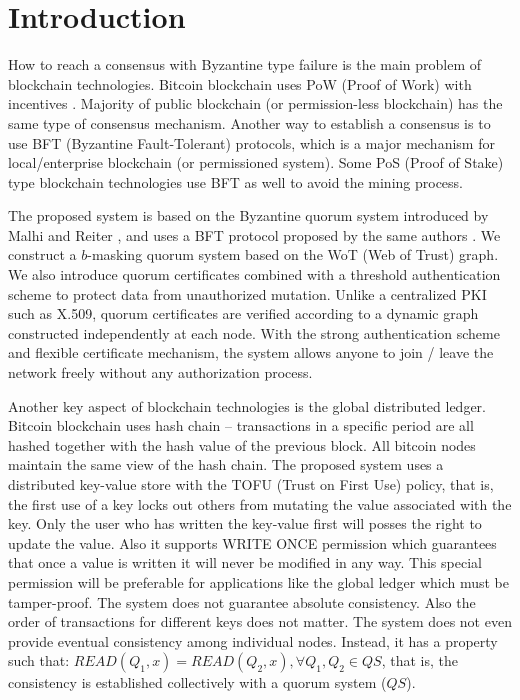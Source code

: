 \section{Introduction}
How to reach a consensus with Byzantine type failure is the main
problem of blockchain technologies. Bitcoin blockchain uses PoW (Proof
of Work) with incentives \cite{bitcoin}. Majority of public blockchain
(or permission-less blockchain) has the same type of consensus
mechanism. Another way to establish a consensus is to use BFT
(Byzantine Fault-Tolerant) protocols, which is a major mechanism for
local/enterprise blockchain (or permissioned system). Some PoS (Proof
of Stake) type blockchain technologies use BFT as well to avoid the
mining process.

The proposed system is based on the Byzantine quorum system introduced
by Malhi and Reiter \cite{Delhi:1}, and uses a BFT protocol proposed by the
same authors \cite{Delhi:2}. We construct a $b$-masking quorum system
based on the WoT (Web of Trust) graph. We also introduce quorum
certificates combined with a threshold authentication scheme to
protect data from unauthorized mutation. Unlike a centralized PKI such
as X.509, quorum certificates are verified according to a dynamic
graph constructed independently at each node. With the strong
authentication scheme and flexible certificate mechanism, the system
allows anyone to join / leave the network freely without any
authorization process.

Another key aspect of blockchain technologies is the global
distributed ledger. Bitcoin blockchain uses hash chain -- transactions
in a specific period are all hashed together with the hash value of
the previous block. All bitcoin nodes maintain the same view of the
hash chain.
The proposed system uses a distributed key-value store with the TOFU
(Trust on First Use) policy, that is, the first use of a key locks out
others from mutating the value associated with the key. Only the
user who has written the key-value first will posses the right to
update the value. Also it supports WRITE ONCE permission which
guarantees that once a value is written it will never be modified in
any way. This special permission will be preferable for applications
like the global ledger which must be tamper-proof.
The system does not guarantee absolute consistency. Also the order of
transactions for different keys does not matter. The system does not
even provide eventual consistency among individual nodes. Instead, it
has a property such that: $READ(Q_1, x) = READ(Q_2, x), \forall Q_1,
Q_2 \in QS$, that is, the consistency is established collectively with
a quorum system ($QS$).

